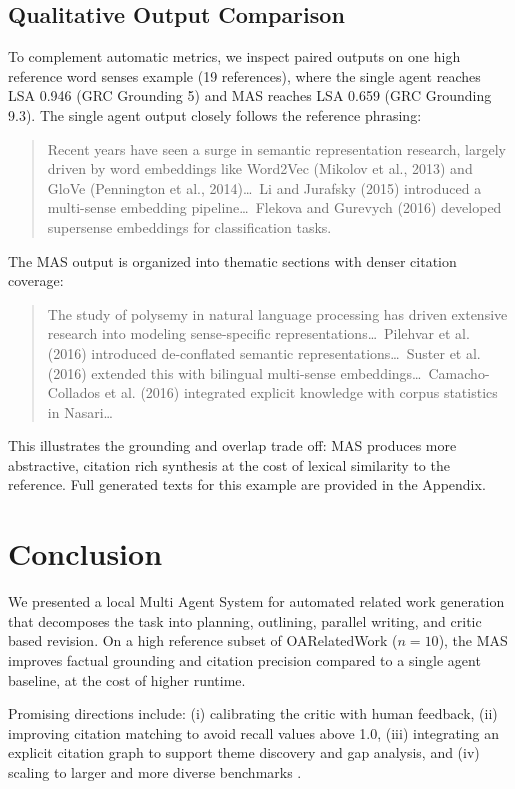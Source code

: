 \documentclass[conference]{IEEEtran}
\begin{document}
\subsection{Qualitative Output Comparison}
To complement automatic metrics, we inspect paired outputs on one high reference word senses example (19 references), where the single agent reaches LSA 0.946 (GRC Grounding 5) and MAS reaches LSA 0.659 (GRC Grounding 9.3). The single agent output closely follows the reference phrasing:
\begin{quote}\small
Recent years have seen a surge in semantic representation research, largely driven by word embeddings like Word2Vec (Mikolov et al., 2013) and GloVe (Pennington et al., 2014)\ldots\ Li and Jurafsky (2015) introduced a multi-sense embedding pipeline\ldots\ Flekova and Gurevych (2016) developed supersense embeddings for classification tasks.
\end{quote}
The MAS output is organized into thematic sections with denser citation coverage:
\begin{quote}\small
The study of polysemy in natural language processing has driven extensive research into modeling sense-specific representations\ldots\ Pilehvar et al. (2016) introduced de-conflated semantic representations\ldots\ Suster et al. (2016) extended this with bilingual multi-sense embeddings\ldots\ Camacho-Collados et al. (2016) integrated explicit knowledge with corpus statistics in Nasari\ldots
\end{quote}
This illustrates the grounding and overlap trade off: MAS produces more abstractive, citation rich synthesis at the cost of lexical similarity to the reference. Full generated texts for this example are provided in the Appendix.

\section{Conclusion}
\label{sec:conclusion}
We presented a local Multi Agent System for automated related work generation that decomposes the task into planning, outlining, parallel writing, and critic based revision.
On a high reference subset of OARelatedWork ($n=10$), the MAS improves factual grounding and citation precision compared to a single agent baseline, at the cost of higher runtime.

Promising directions include: (i) calibrating the critic with human feedback, (ii) improving citation matching to avoid recall values above 1.0, (iii) integrating an explicit citation graph to support theme discovery and gap analysis, and (iv) scaling to larger and more diverse benchmarks \cite{scireviewgen2023,surge2025}.
\end{document}
